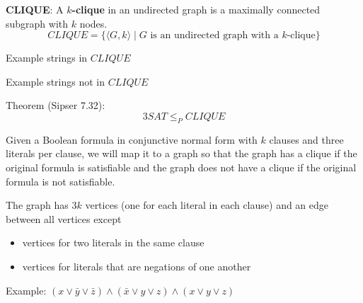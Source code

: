 \vfill
\vfill


\newpage

{\bf CLIQUE}: A {\bf $k$-clique} in an undirected graph is a maximally connected subgraph with $k$  nodes.
\[
CLIQUE  = \{  \langle G, k \rangle \mid \text{$G$ is an  undirected graph with  a $k$-clique} \}
\]


Example strings  in $CLIQUE$

\vfill

Example  strings not  in $CLIQUE$

\vfill

Theorem (Sipser 7.32):
\[
3SAT  \leq_P CLIQUE
\]

Given a Boolean formula in conjunctive normal form with $k$ clauses and three literals per clause, we will 
map it to a graph so that the graph has a clique if the original formula is satisfiable and the 
graph does not have a clique if the original formula is not satisfiable.

The graph has $3k$ vertices (one for each literal in each clause) and an edge between all vertices except
\begin{itemize}
    \item vertices for two literals in the same clause
    \item vertices for literals that are negations of one another
\end{itemize}

Example: $(x \vee \bar{y} \vee {\bar z}) \wedge (\bar{x}  \vee y  \vee  z) \wedge (x \vee y  \vee z)$

\vfill

\newpage
